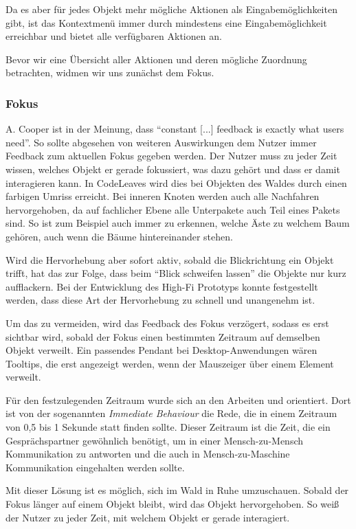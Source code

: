 Da es aber für jedes Objekt mehr mögliche Aktionen als Eingabemöglichkeiten gibt, ist das Kontextmenü immer durch mindestens eine Eingabemöglichkeit erreichbar und bietet alle verfügbaren Aktionen an.

Bevor wir eine Übersicht aller Aktionen und deren mögliche Zuordnung betrachten, widmen wir uns zunächst dem Fokus.

\subsubsection*{Fokus}

A. Cooper ist in \cite{cooper2014face} der Meinung, dass ``constant [...] feedback is exactly what users need''. So sollte abgesehen von weiteren Auswirkungen dem Nutzer immer Feedback zum aktuellen Fokus gegeben werden. Der Nutzer muss zu jeder Zeit wissen, welches Objekt er gerade fokussiert, was dazu gehört und dass er damit interagieren kann. In CodeLeaves wird dies bei Objekten des Waldes durch einen farbigen Umriss erreicht. Bei inneren Knoten werden auch alle Nachfahren hervorgehoben, da auf fachlicher Ebene alle Unterpakete auch Teil eines Pakets sind. So ist zum Beispiel auch immer zu erkennen, welche Äste zu welchem Baum gehören, auch wenn die Bäume hintereinander stehen.

Wird die Hervorhebung aber sofort aktiv, sobald die Blickrichtung ein Objekt trifft, hat das zur Folge, dass beim "`Blick schweifen lassen"' die Objekte nur kurz aufflackern. Bei der Entwicklung des High-Fi Prototyps konnte festgestellt werden, dass diese Art der Hervorhebung zu schnell und unangenehm ist.

Um das zu vermeiden, wird das Feedback des Fokus verzögert, sodass es erst sichtbar wird, sobald der Fokus einen bestimmten Zeitraum auf demselben Objekt verweilt. Ein passendes Pendant bei Desktop-Anwendungen wären Tooltips, die erst angezeigt werden, wenn der Mauszeiger über einem Element verweilt.

Für den festzulegenden Zeitraum wurde sich an den Arbeiten \cite{miller1956magical} und \cite{mishunov2015why} orientiert. Dort ist von der sogenannten \textit{Immediate Behaviour} die Rede, die in einem Zeitraum von 0,5 bis 1 Sekunde statt finden sollte. Dieser Zeitraum ist die Zeit, die ein Gesprächspartner gewöhnlich benötigt, um in einer Mensch-zu-Mensch Kommunikation zu antworten und die auch in Mensch-zu-Maschine Kommunikation eingehalten werden sollte.

Mit dieser Lösung ist es möglich, sich im Wald in Ruhe umzuschauen. Sobald der Fokus länger auf einem Objekt bleibt, wird das Objekt hervorgehoben. So weiß der Nutzer zu jeder Zeit, mit welchem Objekt er gerade interagiert.

